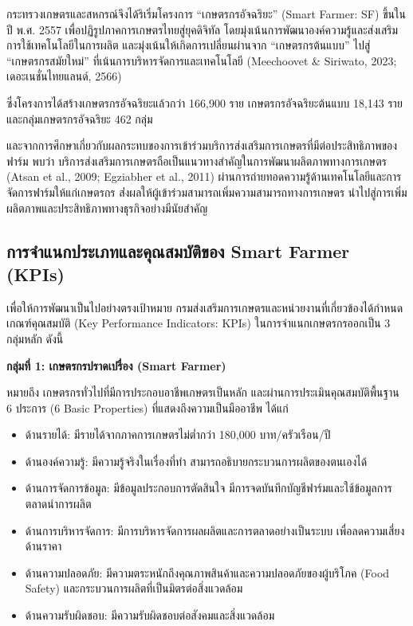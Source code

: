 กระทรวงเกษตรและสหกรณ์จึงได้ริเริ่มโครงการ ``เกษตรกรอัจฉริยะ'' (Smart Farmer: SF) ขึ้นในปี พ.ศ. 2557 เพื่อปฏิรูปภาคการเกษตรไทยสู่ยุคดิจิทัล โดยมุ่งเน้นการพัฒนาองค์ความรู้และส่งเสริมการใช้เทคโนโลยีในการผลิต และมุ่งเน้นให้เกิดการเปลี่ยนผ่านจาก ``เกษตรกรต้นแบบ'' ไปสู่ ``เกษตรกรสมัยใหม่'' ที่เน้นการบริหารจัดการและเทคโนโลยี (Meechoovet \& Siriwato, 2023; เดอะเนชั่นไทยแลนด์, 2566)

ซึ่งโครงการได้สร้างเกษตรกรอัจฉริยะแล้วกว่า 166,900 ราย เกษตรกรอัจฉริยะต้นแบบ 18,143 ราย และกลุ่มเกษตรกรอัจฉริยะ 462 กลุ่ม

และจากการศึกษาเกี่ยวกับผลกระทบของการเข้าร่วมบริการส่งเสริมการเกษตรที่มีต่อประสิทธิภาพของฟาร์ม พบว่า บริการส่งเสริมการเกษตรถือเป็นแนวทางสำคัญในการพัฒนาผลิตภาพทางการเกษตร (Atsan et al., 2009; Egziabher et al., 2011) ผ่านการถ่ายทอดความรู้ด้านเทคโนโลยีและการจัดการฟาร์มให้แก่เกษตรกร
ส่่งผลให้ผู้เข้าร่วมสามารถเพิ่มความสามารถทางการเกษตร นำไปสู่การเพิ่มผลิตภาพและประสิทธิภาพทางธุรกิจอย่างมีนัยสำคัญ \cite{hwang2024}

\subsection{การจำแนกประเภทและคุณสมบัติของ Smart Farmer (KPIs)}

เพื่อให้การพัฒนาเป็นไปอย่างตรงเป้าหมาย กรมส่งเสริมการเกษตรและหน่วยงานที่เกี่ยวข้องได้กำหนดเกณฑ์คุณสมบัติ (Key Performance Indicators: KPIs) ในการจำแนกเกษตรกรออกเป็น 3 กลุ่มหลัก ดังนี้

\textbf{กลุ่มที่ 1: เกษตรกรปราดเปรื่อง (Smart Farmer)}

หมายถึง เกษตรกรทั่วไปที่มีการประกอบอาชีพเกษตรเป็นหลัก และผ่านการประเมินคุณสมบัติพื้นฐาน 6 ประการ (6 Basic Properties) ที่แสดงถึงความเป็นมืออาชีพ ได้แก่

\begin{itemize}
\item ด้านรายได้: มีรายได้จากภาคการเกษตรไม่ต่ำกว่า 180,000 บาท/ครัวเรือน/ปี
\item ด้านองค์ความรู้: มีความรู้จริงในเรื่องที่ทำ สามารถอธิบายกระบวนการผลิตของตนเองได้
\item ด้านการจัดการข้อมูล: มีข้อมูลประกอบการตัดสินใจ มีการจดบันทึกบัญชีฟาร์มและใช้ข้อมูลการตลาดนำการผลิต
\item ด้านการบริหารจัดการ: มีการบริหารจัดการผลผลิตและการตลาดอย่างเป็นระบบ เพื่อลดความเสี่ยงด้านราคา
\item ด้านความปลอดภัย: มีความตระหนักถึงคุณภาพสินค้าและความปลอดภัยของผู้บริโภค (Food Safety) และกระบวนการผลิตที่เป็นมิตรต่อสิ่งแวดล้อม
\item ด้านความรับผิดชอบ: มีความรับผิดชอบต่อสังคมและสิ่งแวดล้อม
\end{itemize}

